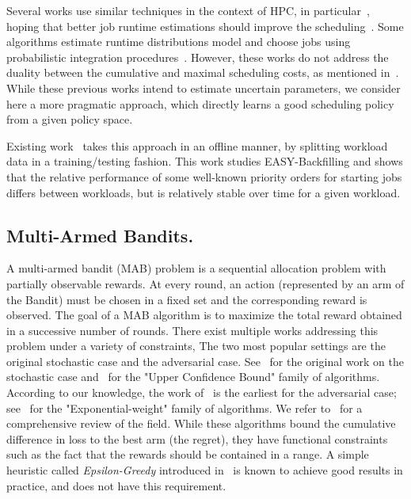 \documentclass[sigconf,anonymous]{acmart}
\begin{document}
Several works use similar techniques in the context of HPC, in
particular~\cite{Tsafrir_easypp_2005,learningruntimes}, hoping that better job
runtime estimations should improve the scheduling~\cite{chiang_impact_2002}.
Some algorithms estimate runtime distributions model and choose jobs using
probabilistic integration procedures~\cite{Nissimov2008}.  However, these works
do not address the duality between the cumulative and maximal scheduling costs,
as mentioned in~\cite{learningruntimes}. While these previous works intend to
estimate uncertain parameters, we consider here a more pragmatic approach,
which directly learns a good scheduling policy from a given policy space.

Existing work~\cite{jsspp17} takes this approach in an offline manner, by
splitting workload data in a training/testing fashion. This work studies
EASY-Backfilling and shows that the relative performance of some well-known
priority orders for starting jobs differs between workloads, but is relatively
stable over time for a given workload.

\subsection{Multi-Armed Bandits.}

A multi-armed bandit (MAB) problem is a sequential allocation problem with
partially observable rewards. At every round, an action (represented by an arm
of the Bandit) must be chosen in a fixed set and the corresponding reward is
observed. The goal of a MAB algorithm is to maximize the total reward obtained
in a successive number of rounds. There exist multiple works addressing
this problem under a variety of constraints, The two most popular settings are
the original stochastic  case and the adversarial case. See~\cite{thompson} for
the original work on the stochastic case and~\cite{Auer2002} for the "Upper
Confidence Bound" family of algorithms. According to our knowledge, the work
of~\cite{Banos} is the earliest for the adversarial case;
see~\cite{nonstoch} for the "Exponential-weight" family of algorithms. We refer
to~\cite{bubnow} for a comprehensive review of the field. While
these algorithms bound the cumulative difference in loss to the best arm (the
regret), they have functional constraints such as the fact that the rewards
should be contained in a range. A simple heuristic called
\textit{Epsilon-Greedy} introduced in~\cite{Auer2002} is known to achieve good
results in practice, and does not have this requirement.
\end{document}
